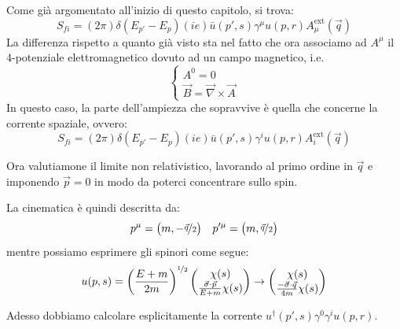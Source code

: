 \documentclass[../main.tex]{subfiles}
\begin{document}
Come già argomentato all'inizio di questo capitolo, si trova:
\[
S_{fi} = (2\pi)\delta(E_{p'}-E_p)(ie)\bar u(p',s)\gamma^\mu u(p,r)A_\mu^{\text{ext}}(\Vec{q})
\]
La differenza rispetto a quanto già visto sta nel fatto che ora associamo ad \(A^\mu\) il 4-potenziale elettromagnetico dovuto ad un campo magnetico, i.e. 
\[
\begin{cases}
A^0=0\\
\Vec{B}=\Vec\nabla\times\Vec{A}
\end{cases}
\] 
In questo caso, la parte dell'ampiezza che sopravvive è quella che concerne la corrente spaziale, ovvero:
\[
\boxed{S_{fi} = (2\pi)\delta(E_{p'}-E_p)(ie)\bar u(p',s)\gamma^i u(p,r)A_i^{\text{ext}}(\Vec{q})}
\]

Ora valutiamone il limite non relativistico, lavorando al primo ordine in \(\Vec{q}\) e imponendo \(\Vec{p}=0\) in modo da poterci concentrare sullo spin.

La cinematica è quindi descritta da:
\[
p^\mu = \big(m, -\nicefrac{\Vec{q}}{2}\big) \quad p'^\mu = \big(m, \nicefrac{\Vec{q}}{2}\big)
\]
mentre possiamo esprimere gli spinori come segue:
\[
u(p,s) = \bigg(\frac{E+m}{2m}\bigg)^{\nicefrac{1}{2}}
\begin{pmatrix} 
\chi(s)\\
\frac{\Vec\sigma\cdot\Vec p}{E+m}\chi(s)
\end{pmatrix}\rightarrow
\begin{pmatrix} 
\chi(s)\\
\frac{-\Vec\sigma\cdot\Vec q}{4m}\chi(s)
\end{pmatrix}
\]

Adesso dobbiamo calcolare esplicitamente la corrente \( u^\dagger(p',s)\gamma^0 \gamma^i u(p,r)\).
\end{document}
